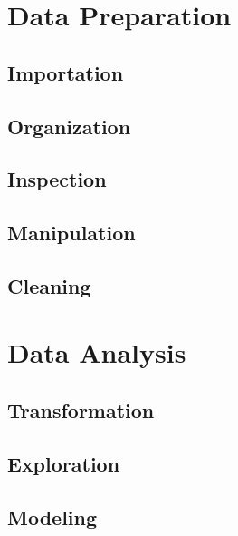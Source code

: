 \documentclass[
]{book}
\begin{document}
\hypertarget{data_prep}{%
\chapter{Data Preparation}\label{data_prep}}

\hypertarget{importation}{%
\section{Importation}\label{importation}}

\hypertarget{organization}{%
\section{Organization}\label{organization}}

\hypertarget{inspection}{%
\section{Inspection}\label{inspection}}

\hypertarget{manipulation}{%
\section{Manipulation}\label{manipulation}}

\hypertarget{cleaning}{%
\section{Cleaning}\label{cleaning}}

\hypertarget{data_analysis}{%
\chapter{Data Analysis}\label{data_analysis}}

\hypertarget{transformation}{%
\section{Transformation}\label{transformation}}

\hypertarget{exploration}{%
\section{Exploration}\label{exploration}}

\hypertarget{modeling}{%
\section{Modeling}\label{modeling}}
\end{document}
